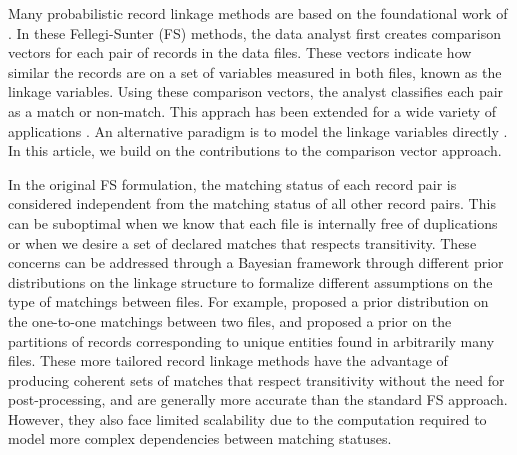\documentclass[12pt,letterpaper]{article}
\newcommand{\1}[1]{\mathbb{I}\!\left[#1\right]} %
\begin{document}

Many probabilistic record linkage methods are based on the foundational work of \cite{fellegi_theory_1969}. In these Fellegi-Sunter (FS) methods, the data analyst first creates comparison vectors for each pair of records in the data files. These vectors indicate how similar the records are on a set of variables measured in both files, known as the linkage variables.  Using these comparison vectors, the analyst classifies each pair as a match or non-match. This apprach has been extended for a wide variety of applications \citep{fair2004generalized, winkler_state_1999, wagner2014person, gill2003english}.  An alternative paradigm is to model the linkage variables directly \citep[e.g.,][]{Tancredi_2011, steorts_bayesian_2016, marchant_d-blink_2019, betancourt2022prior}. In this article, we build on the contributions to the comparison vector approach.

In the original FS formulation, the matching status of each record pair is considered independent from the matching status of all other record pairs. This can be suboptimal when we know that each file is internally free of duplications or when we desire a set of declared matches that respects transitivity. These concerns can be addressed through a Bayesian framework through different prior distributions on the linkage structure to formalize different assumptions on the type of matchings between files. For example, \cite{sadinle_bayesian_2017} proposed a prior distribution on the one-to-one matchings between two files, and \cite{aleshin2023multifile} proposed a prior on the partitions of records corresponding to unique entities found in arbitrarily many files. These more tailored record linkage methods have the advantage of producing coherent sets of matches that respect transitivity without the need for post-processing, and are generally more accurate than the standard FS approach. However, they also face limited scalability due to the computation required to model more complex dependencies between matching statuses. 

\end{document}
